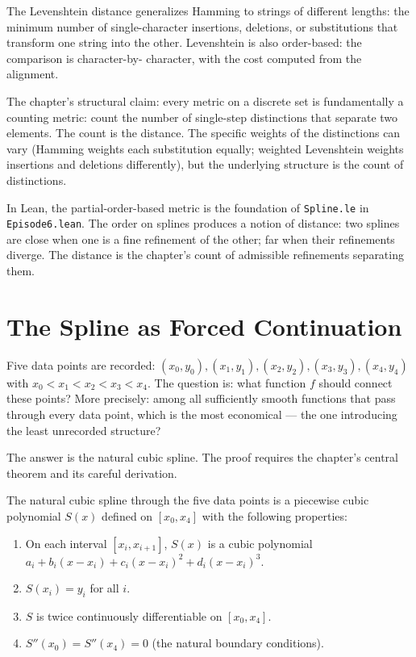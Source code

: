 The Levenshtein distance generalizes Hamming to strings of different
lengths: the minimum number of single-character insertions,
deletions, or substitutions that transform one string into the other.
Levenshtein is also order-based: the comparison is character-by-
character, with the cost computed from the alignment.

The chapter's structural claim: every metric on a discrete set is
fundamentally a counting metric: count the number of single-step
distinctions that separate two elements. The count is the distance.
The specific weights of the distinctions can vary (Hamming weights
each substitution equally; weighted Levenshtein weights insertions
and deletions differently), but the underlying structure is the
count of distinctions.

In Lean, the partial-order-based metric is the foundation of
\texttt{Spline.le} in \texttt{Episode6.lean}. The order on splines
produces a notion of distance: two splines are close when one is a
fine refinement of the other; far when their refinements diverge.
The distance is the chapter's count of admissible refinements
separating them.

\section{The Spline as Forced Continuation}
\label{se:the-spline-as-forced-continuation}

Five data points are recorded: $(x_0, y_0), (x_1, y_1), (x_2, y_2),
(x_3, y_3), (x_4, y_4)$ with $x_0 < x_1 < x_2 < x_3 < x_4$. The
question is: what function $f$ should connect these points? More
precisely: among all sufficiently smooth functions that pass through
every data point, which is the most economical --- the one introducing
the least unrecorded structure?

The answer is the natural cubic spline. The proof requires the
chapter's central theorem and its careful derivation.

The natural cubic spline through the five data points is a piecewise
cubic polynomial $S(x)$ defined on $[x_0, x_4]$ with the following
properties:
\begin{enumerate}
\item On each interval $[x_i, x_{i+1}]$, $S(x)$ is a cubic polynomial
$a_i + b_i (x - x_i) + c_i (x - x_i)^2 + d_i (x - x_i)^3$.
\item $S(x_i) = y_i$ for all $i$.
\item $S$ is twice continuously differentiable on $[x_0, x_4]$.
\item $S''(x_0) = S''(x_4) = 0$ (the natural boundary conditions).
\end{enumerate}

